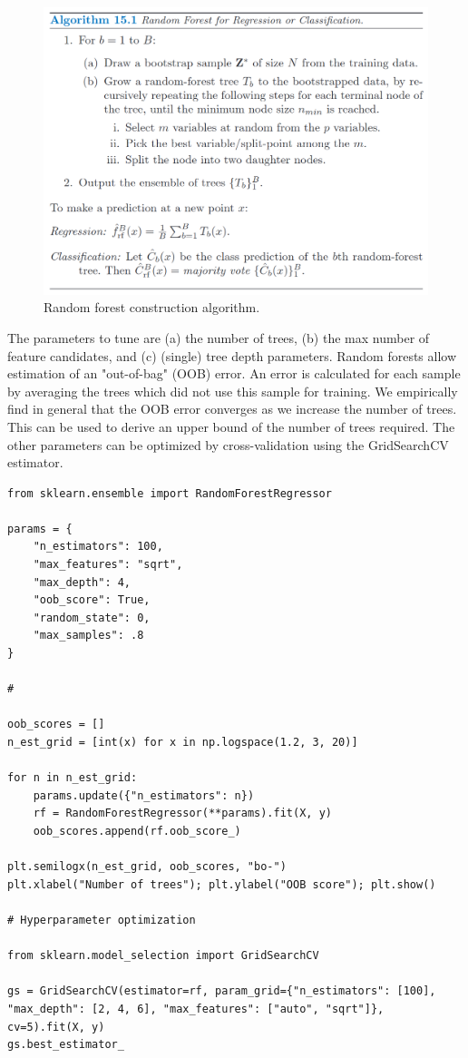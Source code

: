 \documentclass[]{article}
\begin{document}
\begin{figure}[H]
	\center \includegraphics[scale=.25]{random-forests}
	\caption{Random forest construction algorithm.}
\end{figure}

\noindent The parameters to tune are (a) the number of trees, (b) the max number of feature candidates, and (c) (single) tree depth parameters. Random forests allow estimation of an "out-of-bag" (OOB) error. An error is calculated for each sample by averaging the trees which did not use this sample for training. We empirically find in general that the OOB error converges as we increase the number of trees. This can be used to derive an upper bound of the number of trees required. The other parameters can be optimized by cross-validation using the GridSearchCV estimator.

\begin{lstlisting}
from sklearn.ensemble import RandomForestRegressor

params = {
	"n_estimators": 100,
	"max_features": "sqrt", 
	"max_depth": 4, 
	"oob_score": True, 
	"random_state": 0, 
	"max_samples": .8    
}

# 

oob_scores = []
n_est_grid = [int(x) for x in np.logspace(1.2, 3, 20)]

for n in n_est_grid:
	params.update({"n_estimators": n})
	rf = RandomForestRegressor(**params).fit(X, y)
	oob_scores.append(rf.oob_score_)

plt.semilogx(n_est_grid, oob_scores, "bo-")
plt.xlabel("Number of trees"); plt.ylabel("OOB score"); plt.show()

# Hyperparameter optimization

from sklearn.model_selection import GridSearchCV

gs = GridSearchCV(estimator=rf, param_grid={"n_estimators": [100], "max_depth": [2, 4, 6], "max_features": ["auto", "sqrt"]}, cv=5).fit(X, y)
gs.best_estimator_
\end{lstlisting}
\end{document}
